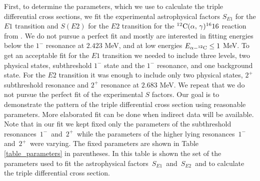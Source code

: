 \documentclass[prl,unsortedaddress,groupedaddress,twocolumn,amsmath,amsfonts,amssymb,showpacs,floatfix,nofootinbib]{revtex4}
\begin{document}
First, to determine the parameters, which we use to calculate the triple differential cross sections, we fit the experimental  astrophysical factors $S_{E1}$ for the $E1$ transition and 
$S(E2)$ for the $E2$ transition for the ${}^{12}{\rm C}(\alpha,\,\gamma){}^{16}{\rm 16}$ reaction from \cite{redder}. We do not pursue a perfect fit and mostly are interested in fitting energies below the $1^{-}$ resonance at $2.423$ MeV,  and at low energies $E_{\alpha-{}^{12}{\rm C}} \leq 1$ MeV. To get an acceptable fit for the $E1$ transition we needed  to include three levels, two physical states, subthreshold $1^{-}$ state and the $1^{-}$ resonance, and one background state. For the $E2$ transition it was enough to include only two physical states, $2^{+}$ subthreshold resonance and $2^{+}$ resonance at $2.683$ MeV. We repeat that we do not pursue the perfect fit of the experimental $S$ factors. Our goal is to demonstrate the pattern of the triple differential cross section using reasonable parameters. More elaborated fit can be done when indirect data will be available.
 Note that in our fit we kept fixed only the parameters of the subthreshold resonances $\,1^{-}\,$ and $\,2^{+}\,$ while the parameters of the higher lying resonances $\,1^{-}\,$ and $\,2^{+}\,$ were varying.
The fixed parameters are shown in Table \ref{table_parameters} in parentheses. In this table is shown
the set of the parameters used to fit the astrophysical factors $\,S_{E1}\,$ and $\,S_{E2}\,$ and to calculate the triple differential cross section. 
\tabcolsep=3pt
\end{document}

